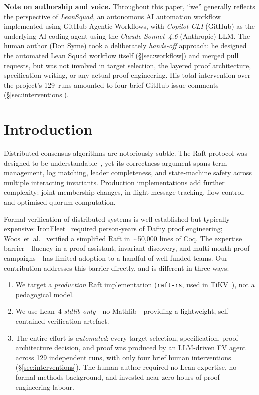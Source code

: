 \documentclass[sigconf,10pt]{acmart}
\begin{document}
\maketitle

\noindent\textbf{Note on authorship and voice.}  Throughout this paper, ``we''
generally reflects the perspective of \emph{LeanSquad}, an autonomous AI
automation workflow implemented using GitHub Agentic Workflows, with
\emph{Copilot CLI} (GitHub) as the underlying AI coding agent using the \emph{Claude Sonnet~4.6} (Anthropic) LLM.  The human
author (Don Syme) took a deliberately \emph{hands-off} approach: he
designed the automated Lean Squad workflow itself (\S\ref{sec:workflow}) and
merged pull requests, but was not involved in target selection,
the layered proof architecture, specification writing, or any actual
proof engineering.  His total intervention over the project's 129~runs
amounted to four brief GitHub issue comments (\S\ref{sec:interventions}).
\medskip


\section{Introduction}

Distributed consensus algorithms are notoriously subtle.  The Raft protocol
was designed to be understandable~\cite{ongaro2014raft}, yet its correctness
argument spans term management, log matching, leader completeness, and
state-machine safety across multiple interacting invariants.  Production
implementations add further complexity: joint membership changes, in-flight
message tracking, flow control, and optimised quorum computation.

Formal verification of distributed systems is well-established but
typically expensive: IronFleet~\cite{ironfleet} required person-years of
Dafny proof engineering; Woos~et~al.~\cite{vard} verified a simplified
Raft in $\sim$50,000 lines of Coq.  The expertise barrier---fluency in a
proof assistant, invariant discovery, and multi-month proof campaigns---has
limited adoption to a handful of well-funded teams.  Our contribution
addresses this barrier directly, and is different in three ways:

\begin{enumerate}
\item We target a \emph{production} Raft implementation (\texttt{raft-rs},
  used in TiKV~\cite{raftrs}), not a pedagogical model.
\item We use Lean~4 \emph{stdlib only}---no Mathlib---providing a lightweight,
  self-contained verification artefact.
\item The entire effort is \emph{automated}: every target selection,
  specification, proof architecture decision, and proof was produced by an
  LLM-driven FV agent across 129 independent runs, with only four brief
  human interventions (\S\ref{sec:interventions}).  The human author
  required no Lean expertise, no formal-methods background, and invested
  near-zero hours of proof-engineering labour.
\end{enumerate}
\end{document}
